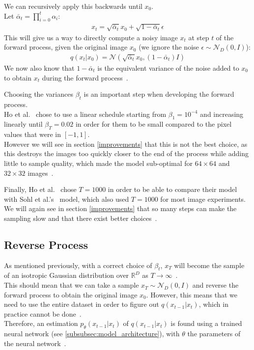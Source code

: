 \documentclass[twoside]{article}
\numberwithin{equation}{section}
\numberwithin{figure}{section}
\begin{document}
We can recursively apply this backwards until $x_0$. \\
Let $\bar{\alpha}_t = \prod_{i=0}^{t}{\alpha_i}$:
\begin{align}
  x_t = \sqrt{\bar{\alpha}_t} x_0 + \sqrt{1 - \bar{\alpha}_t} \epsilon
\end{align}
This will give us a way to directly compute a noisy image $x_t$ at step $t$ of the forward process, given the original image $x_0$ (we ignore the noise $\epsilon \sim \mathcal{N}_D\left(0, I\right)$):
\begin{align}
  q\left(x_t | x_0\right) = \mathcal{N}\left(\sqrt{\bar{\alpha}_t} x_0, \left(1 - \bar{\alpha}_t\right)I\right) \label{eq:quickforwardprocess}
\end{align}
We now also know that $1 - \bar{\alpha}_t$ is the equivalent variance of the noise added to $x_0$ to obtain $x_t$ during the forward process~\cite{nichol2021improved}.

Choosing the variances $\beta_t$ is an important step when developing the forward process. \\
Ho et al.~\cite{ho2020denoising} chose to use a linear schedule starting from $\beta_1 = 10^{-4}$ and increasing linearly until $\beta_T = 0.02$ in order for them to be small compared to the pixel values that were in $\left[-1, 1\right]$. \\
However we will see in section \ref{improvements} that this is not the best choice, as this destroys the images too quickly closer to the end of the process while adding little to sample quality, which made the model sub-optimal for $64 \times 64$ and $32 \times 32$ images~\cite{nichol2021improved}.

Finally, Ho et al.~\cite{ho2020denoising} chose $T = 1000$ in order to be able to compare their model with Sohl et al.'s~\cite{sohldickstein2015deep} model, which also used $T = 1000$ for most image experiments. \\
We will again see in section \ref{improvements} that so many steps can make the sampling slow and that there exist better choices~\cite{nichol2021improved}.
\subsection{Reverse Process}
As mentioned previously, with a correct choice of $\beta_t$, $x_T$ will become the sample of an isotropic Gaussian distribution over $\mathbb{R}^D$ as $T \rightarrow \infty$~\cite{nichol2021improved, sohldickstein2015deep}. \\
This should mean that we can take a sample $x_T \sim \mathcal{N}_D \left(0, I\right)$ and reverse the forward process to obtain the original image $x_0$. 
However, this means that we need to use the entire dataset in order to figure out $q\left(x_{t-1} | x_t\right)$, which in practice cannot be done~\cite{nichol2021improved}. \\
Therefore, an estimation $p_\theta (x_{t-1} | x_t)$ of $q(x_{t-1}|x_t)$ is found using a trained neural network (see \ref{subsubsec:model_architecture}), with $\theta$ the parameters of the neural network~\cite{nichol2021improved}.
\end{document}
